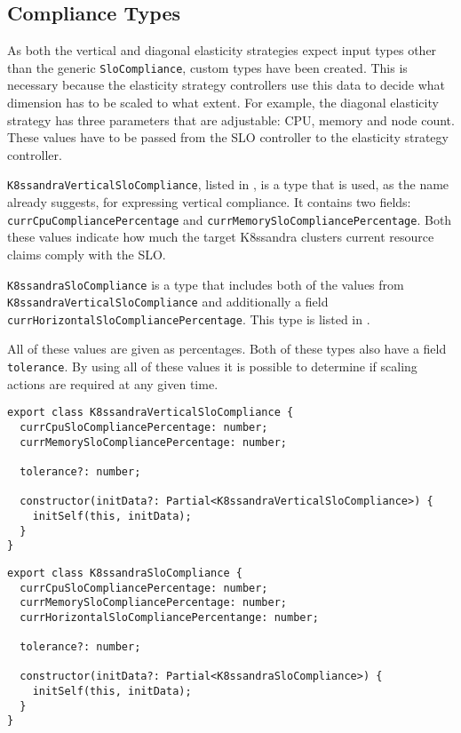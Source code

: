 \subsection{Compliance Types}
\label{sec:compliance-types}

As both the vertical and diagonal elasticity strategies expect input types other than the generic \texttt{SloCompliance}, custom types have been created. This is necessary because the elasticity strategy controllers use this data to decide what dimension has to be scaled to what extent. For example, the diagonal elasticity strategy has three parameters that are adjustable: CPU, memory and node count. These values have to be passed from the SLO controller to the elasticity strategy controller.

\texttt{K8ssandraVerticalSloCompliance}, listed in , is a type that is used, as the name already suggests, for expressing vertical compliance. It contains two fields: \texttt{curr\-Cpu\-Com\-pli\-ance\-Per\-cen\-tage} and \texttt{curr\-Memory\-Slo\-Com\-pli\-ance\-Per\-cen\-tage}. Both these values indicate how much the target K8ssandra clusters current resource claims comply with the SLO.

\texttt{K8ssandraSloCompliance} is a type that includes both of the values from \texttt{K8\-ssan\-dra\-Vertical\-Slo\-Com\-pli\-ance} and additionally a field \texttt{curr\-Horizontal\-Slo\-Com\-pli\-ance\-Per\-cen\-tage}. This type is listed in .

All of these values are given as percentages. Both of these types also have a field \texttt{tolerance}. By using all of these values it is possible to determine if scaling actions are required at any given time.

\begin{lstlisting}[caption={K8ssandraVerticalSloCompliance},
                    captionpos=b,
                    label=lst:K8ssandraVerticalSloCompliance,
                    float]
export class K8ssandraVerticalSloCompliance {
  currCpuSloCompliancePercentage: number;
  currMemorySloCompliancePercentage: number;

  tolerance?: number;

  constructor(initData?: Partial<K8ssandraVerticalSloCompliance>) {
    initSelf(this, initData);
  }
}
\end{lstlisting}

\begin{lstlisting}[caption={K8ssandraSloCompliance},
                    captionpos=b,
                    label=lst:K8ssandraSloCompliance,
                    float]
export class K8ssandraSloCompliance {
  currCpuSloCompliancePercentage: number;
  currMemorySloCompliancePercentage: number;
  currHorizontalSloCompliancePercentange: number;

  tolerance?: number;

  constructor(initData?: Partial<K8ssandraSloCompliance>) {
    initSelf(this, initData);
  }
}
\end{lstlisting}

